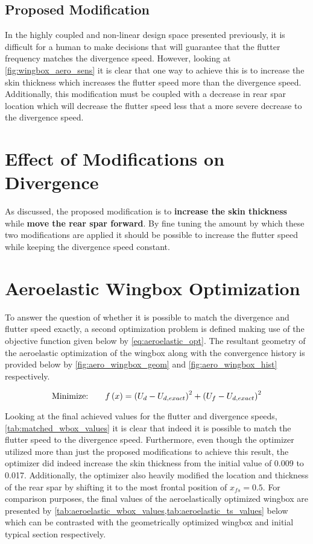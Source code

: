 \subsection{Proposed Modification}
In the highly coupled and non-linear design space presented previously, it is
difficult for a human to make decisions that will guarantee that the flutter
frequency matches the divergence speed. However, looking at
\cref{fig:wingbox_aero_sens} it is clear that one way to achieve this
is to increase the skin thickness which increases the flutter speed more than
the divergence speed. Additionally, this modification must be coupled with
a decrease in rear spar location which will decrease the flutter speed less
that a more severe decrease to the divergence speed.

\section{Effect of Modifications on Divergence}

As discussed, the proposed modification is to \textbf{increase the skin
thickness} while \textbf{move the rear spar forward}. By fine tuning the amount
by which these two modifications are applied it should be possible to increase
the flutter speed while keeping the divergence speed constant.

\section{Aeroelastic Wingbox Optimization}

To answer the question of whether it is possible to match the divergence and
flutter speed exactly, a second optimization problem is defined making use of
the objective function given below by \cref{eq:aeroelastic_opt}. The resultant
geometry of the aeroelastic optimization of the wingbox along with the
convergence history is provided below by \cref{fig:aero_wingbox_geom} and
\cref{fig:aero_wingbox_hist} respectively.

\begin{equation}
    \label{eq:aeroelastic_opt}
    \text{Minimize:} \hspace{2em}
        f\left(x\right) =
        \left(U_d - U_{d,exact}\right)^2 +
        \left(U_f - U_{d,exact}\right)^2 \\[1em]
\end{equation}

Looking at the final achieved values for the flutter and divergence speeds,
\cref{tab:matched_wbox_values} it is clear that indeed it is possible to match
the flutter speed to the divergence speed. Furthermore, even though the
optimizer utilized more than just the proposed modifications to achieve this
result, the optimizer did indeed increase the skin thickness from the initial
value of 0.009 to 0.017. Additionally, the optimizer also heavily modified the
location and thickness of the rear spar by shifting it to the most frontal
position of $x_{fs} = 0.5$. For comparison purposes, the final values of the
aeroelastically optimized wingbox are presented by
\cref{tab:aeroelastic_wbox_values,tab:aeroelastic_ts_values} below which can be
contrasted with the geometrically optimized wingbox and initial typical section
respectively.

